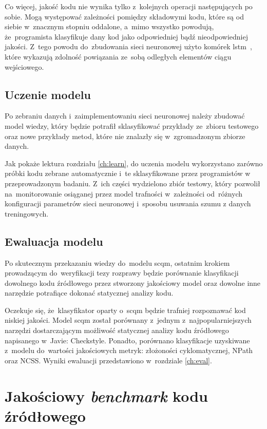 \documentclass[twoside]{praca}
\begin{document}
Co więcej, jakość kodu nie wynika tylko z~kolejnych operacji następujących po sobie. Mogą występować zależności pomiędzy składowymi kodu, które są od siebie w~znacznym stopniu oddalone, a~mimo wszystko powodują, że~programista klasyfikuje dany kod jako odpowiedniej bądź nieodpowiedniej jakości. Z~tego powodu do~zbudowania sieci neuronowej użyto komórek \gls{lstm}~\cite{gers1999learning}, które wykazują zdolność powiązania ze~sobą odległych elementów ciągu wejściowego.

\subsection{Uczenie modelu}
Po zebraniu danych i~zaimplementowaniu sieci neuronowej należy zbudować model wiedzy, który będzie potrafił sklasyfikować przykłady ze~zbioru testowego oraz nowe przykłady metod, które nie znalazły się w~zgromadzonym zbiorze danych.

Jak pokaże lektura rozdziału \ref{ch:learn}, do uczenia modelu wykorzystano zarówno próbki kodu zebrane automatycznie i~te sklasyfikowane przez programistów w przeprowadzonym badaniu. Z~ich części wydzielono zbiór testowy, który pozwolił na~monitorowanie osiąganej przez model trafności w~zależności od~różnych konfiguracji parametrów sieci neuronowej i~sposobu usuwania szumu z danych treningowych.

\subsection{Ewaluacja modelu}
Po skutecznym przekazaniu wiedzy do~modelu \gls{scqm}, ostatnim krokiem prowadzącym do~weryfikacji tezy rozprawy będzie porównanie klasyfikacji dowolnego kodu źródłowego przez stworzony jakościowy model oraz dowolne inne narzędzie potrafiące dokonać statycznej analizy kodu.

Oczekuje się, że~klasyfikator oparty o~\gls{scqm} będzie trafniej rozpoznawać kod niskiej jakości. Model \gls{scqm} został porównany z~jednym z~najpopularniejszych narzędzi dostarczającym możliwość statycznej analizy kodu źródłowego napisanego w~Javie: Checkstyle. Ponadto, porównano klasyfikacje uzyskiwane z~modelu do~wartości jakościowych metryk: złożoności cyklomatycznej, NPath oraz NCSS. Wyniki ewaluacji przedstawiono w~rozdziale \ref{ch:eval}.

\section{Jakościowy \textit{benchmark} kodu źródłowego}
\label{sec:proj:benchmark}
\end{document}
